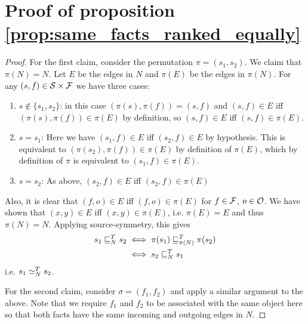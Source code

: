 \documentclass[../main.tex]{subfiles}
\begin{document}
\section{Proof of proposition \ref{prop:same_facts_ranked_equally}}
\begin{proof}

For the first claim, consider the permutation $\pi = (s_1, s_2)$. We claim that
$\pi(N) = N$. Let $E$ be the edges in $N$ and $\pi(E)$ be the edges in
$\pi(N)$. For any $(s, f) \in \mathcal{S} \times \mathcal{F}$ we have three cases:
\begin{enumerate}
\item $s \notin \{s_1, s_2\}$: in this case $(\pi(s), \pi(f)) = (s, f)$ and
$(s, f) \in E$ iff $(\pi(s), \pi(f)) \in \pi(E)$ by definition, so
$(s, f) \in E$ iff $(s, f) \in \pi(E)$.

\item $s=s_1$: Here we have $(s_1, f) \in E$ iff $(s_2, f) \in E$ by
hypothesis. This is equivalent to $(\pi(s_2), \pi(f)) \in \pi(E)$ by definition
of $\pi(E)$, which by definition of $\pi$ is equivalent to $(s_1, f) \in
\pi(E)$.

\item $s=s_2$: As above, $(s_2, f) \in E$ iff $(s_2, f) \in \pi(E)$
\end{enumerate}
Also, it is clear that $(f, o) \in E$ iff $(f, o) \in \pi(E)$ for $f \in \mathcal{F}$,
$o \in \mathcal{O}$. We have shown that $(x, y) \in E$ iff $(x, y) \in \pi(E)$, i.e.
$\pi(E) = E$ and thus $\pi(N) = N$. Applying source-symmetry, this gives
\begin{align*}
    s_1 \sqsubseteq_N^T s_2 & \iff \pi(s_1) \sqsubseteq_{\pi(N)}^T \pi(s_2) \\
                     & \iff s_2 \sqsubseteq_N^T s_1
\end{align*}
i.e. $s_1 \simeq_N^T s_2$.

For the second claim, consider $\sigma = (f_1, f_2)$ and apply a similar
argument to the above. Note that we require $f_1$ and $f_2$ to be associated
with the same object here so that both facts have the same incoming and
outgoing edges in $N$.

\end{proof}
\end{document}
